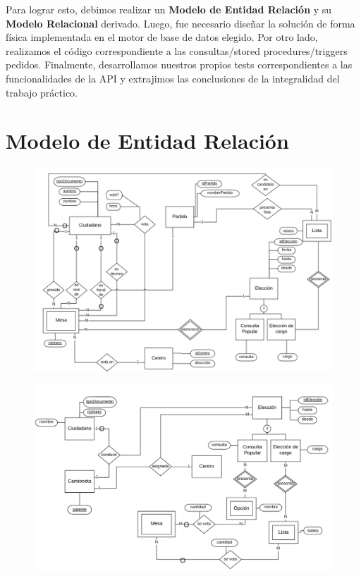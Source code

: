 \documentclass[10pt,a4paper]{article}
\begin{document}
Para lograr esto, debimos realizar un \textbf{Modelo de Entidad Relación} y su \textbf{Modelo Relacional} derivado. Luego, fue necesario diseñar la solución de forma física implementada en el motor de base de datos elegido. Por otro lado, realizamos el código correspondiente a las consultas/stored procedures/triggers pedidos. Finalmente, desarrollamos nuestros propios tests correspondientes a las funcionalidades de la API y extrajimos las conclusiones de la integralidad del trabajo práctico.

\newpage
\section{Modelo de Entidad Relación}

\begin{figure}[H] %
\begin{center}
\includegraphics[width=450pt]{./diagramas/DER01.png}
\end{center}
\end{figure}

\begin{figure}[H] %
\begin{center}
\includegraphics[width=450pt]{./diagramas/DER02.png}
\end{center}
\end{figure}
\end{document}
